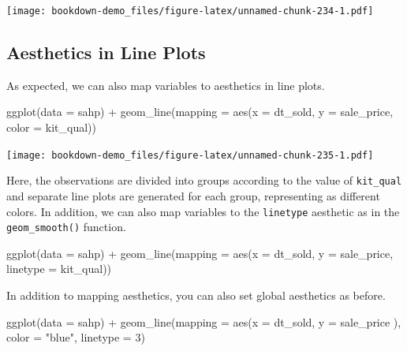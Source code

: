 \documentclass[
]{book}
\newenvironment{Shaded}{\begin{snugshade}}{\end{snugshade}}
\newcommand{\AttributeTok}[1]{\textcolor[rgb]{0.77,0.63,0.00}{#1}}
\newcommand{\DecValTok}[1]{\textcolor[rgb]{0.00,0.00,0.81}{#1}}
\newcommand{\FunctionTok}[1]{\textcolor[rgb]{0.00,0.00,0.00}{#1}}
\newcommand{\NormalTok}[1]{#1}
\newcommand{\SpecialCharTok}[1]{\textcolor[rgb]{0.00,0.00,0.00}{#1}}
\newcommand{\StringTok}[1]{\textcolor[rgb]{0.31,0.60,0.02}{#1}}
\begin{document}
\texttt{[image: bookdown-demo\_files/figure-latex/unnamed-chunk-234-1.pdf]}

\hypertarget{aesthetics-in-line-plots}{%
\subsection{Aesthetics in Line Plots}\label{aesthetics-in-line-plots}}

As expected, we can also map variables to aesthetics in line plots.

\begin{Shaded}
\begin{Highlighting}[]
\FunctionTok{ggplot}\NormalTok{(}\AttributeTok{data =}\NormalTok{ sahp) }\SpecialCharTok{+} \FunctionTok{geom\_line}\NormalTok{(}\AttributeTok{mapping =} \FunctionTok{aes}\NormalTok{(}\AttributeTok{x =}\NormalTok{ dt\_sold, }\AttributeTok{y =}\NormalTok{ sale\_price, }\AttributeTok{color =}\NormalTok{ kit\_qual))}
\end{Highlighting}
\end{Shaded}

\texttt{[image: bookdown-demo\_files/figure-latex/unnamed-chunk-235-1.pdf]}

Here, the observations are divided into groups according to the value of \texttt{kit\_qual} and separate line plots are generated for each group, representing as different colors. In addition, we can also map variables to the \texttt{linetype} aesthetic as in the \texttt{geom\_smooth()} function.

\begin{Shaded}
\begin{Highlighting}[]
\FunctionTok{ggplot}\NormalTok{(}\AttributeTok{data =}\NormalTok{ sahp) }\SpecialCharTok{+} \FunctionTok{geom\_line}\NormalTok{(}\AttributeTok{mapping =} \FunctionTok{aes}\NormalTok{(}\AttributeTok{x =}\NormalTok{ dt\_sold, }\AttributeTok{y =}\NormalTok{ sale\_price, }\AttributeTok{linetype =}\NormalTok{ kit\_qual))}
\end{Highlighting}
\end{Shaded}

In addition to mapping aesthetics, you can also set global aesthetics as before.

\begin{Shaded}
\begin{Highlighting}[]
\FunctionTok{ggplot}\NormalTok{(}\AttributeTok{data =}\NormalTok{ sahp) }\SpecialCharTok{+} \FunctionTok{geom\_line}\NormalTok{(}\AttributeTok{mapping =} \FunctionTok{aes}\NormalTok{(}\AttributeTok{x =}\NormalTok{ dt\_sold, }\AttributeTok{y =}\NormalTok{ sale\_price ), }\AttributeTok{color =} \StringTok{"blue"}\NormalTok{, }\AttributeTok{linetype =} \DecValTok{3}\NormalTok{)}
\end{Highlighting}
\end{Shaded}
\end{document}
